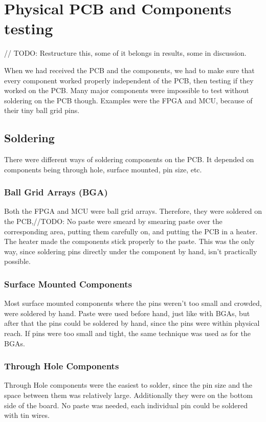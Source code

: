 \section{Physical PCB and Components testing}

// TODO: Restructure this, some of it belongs in results, some in discussion.

When we had received the PCB and the components, we had to make sure that every component worked properly independent of the PCB, then testing if they worked on the PCB. Many major components were impossible to test without soldering on the PCB though. Examples were the FPGA and MCU, because of their tiny ball grid pins.

\subsection{Soldering}
There were different ways of soldering components on the PCB. It depended on components being through hole, surface mounted, pin size, etc.
\subsubsection{Ball Grid Arrays (BGA)}
Both the FPGA and MCU were ball grid arrays.
Therefore, they were soldered on the PCB,//TODO: No paste were smeard by smearing paste over the corresponding area, putting them carefully on, and putting the PCB in a heater. The heater made the components stick properly to the paste. This was the only way, since soldering pins directly under the component by hand, isn't practically possible.

\subsubsection{Surface Mounted Components}
Most surface mounted components where the pins weren't too small and crowded, were soldered by hand. Paste were used before hand, just like with BGAs, but after that the pins could be soldered by hand, since the pins were within physical reach. 
\newline
If pins were too small and tight, the same technique was used as for the BGAs.

\subsubsection{Through Hole Components}
Through Hole components were the easiest to solder, since the pin size and the space between them was relatively large. Additionally they were on the bottom side of the board. No paste was needed, each individual pin could be soldered with tin wires.

